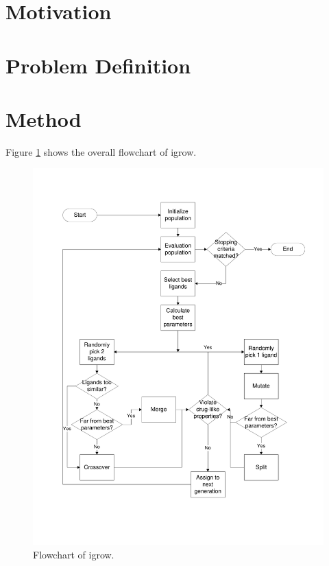 \documentclass[10pt, conference, compsocconf]{../IEEEtran}
\begin{document}
\section{Motivation}



\section{Problem Definition}



\section{Method}

Figure \ref{fig:Flowchart} shows the overall flowchart of igrow. 

\begin{figure}
\centering
\includegraphics[width=\linewidth]{Figures/Methods/Flowchart.pdf}
\caption{Flowchart of igrow.}
\label{fig:Flowchart}
\end{figure}
\end{document}
